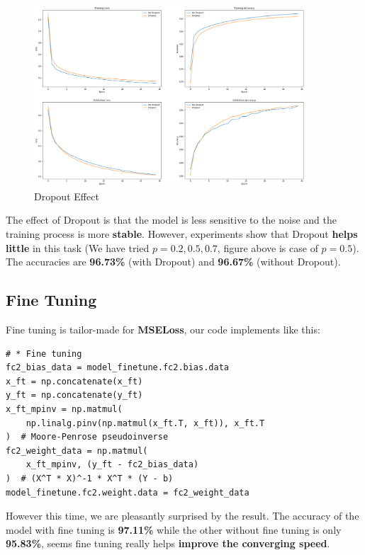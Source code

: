 \documentclass[a4paper, 11pt]{article} %
\begin{document}
\begin{figure}[H]
    \centering
    \includegraphics[width=0.9\textwidth]{./img/dropout.png}
    \caption{Dropout Effect}
\end{figure}

The effect of Dropout is that the model is less sensitive to the noise and the training
process is more \textbf{stable}. However, experiments show that Dropout \textbf{helps little}
in this task (We have tried $p=0.2,0.5,0.7$, figure above is case of $p=0.5$). The accuracies
are \textbf{96.73\%} (with Dropout) and \textbf{96.67\%} (without Dropout).

\subsection{\textbf{Fine Tuning}}

Fine tuning is tailor-made for \textbf{MSELoss}, our code implements like this:

\begin{lstlisting}
# * Fine tuning
fc2_bias_data = model_finetune.fc2.bias.data
x_ft = np.concatenate(x_ft)
y_ft = np.concatenate(y_ft)
x_ft_mpinv = np.matmul(
    np.linalg.pinv(np.matmul(x_ft.T, x_ft)), x_ft.T
)  # Moore-Penrose pseudoinverse
fc2_weight_data = np.matmul(
    x_ft_mpinv, (y_ft - fc2_bias_data)
)  # (X^T * X)^-1 * X^T * (Y - b)
model_finetune.fc2.weight.data = fc2_weight_data
\end{lstlisting}

However this time, we are pleasantly surprised by the result. The accuracy of the model with
fine tuning is \textbf{97.11\%} while the other without fine tuning is only \textbf{95.83\%},
seems fine tuning really helps \textbf{improve the converging speed}.
\end{document}
